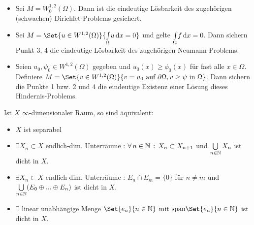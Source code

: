 \documentclass{cheat-sheet}
\begin{document}
\begin{bsp}
  \begin{itemize}
    \item Sei $M = W_0^{1,2}(\Omega)$. Dann ist die eindeutige Lösbarkeit des zugehörigen (schwachen) Dirichlet-Problems gesichert.
    \item Sei $M = \Set{ u \in W^{1,2}(\Omega) }{ \Int{\Omega}{}{u}{x} = 0 }$ und gelte ${\textstyle \int\limits_{\Omega}^{}} f \,\mathrm{d} x = 0$. Dann sichern Punkt 3, 4 die eindeutige Lösbarkeit des zugehörigen Neumann-Problems.
    \item Seien $u_0, \psi_0 \in W^{1,2}(\Omega)$ gegeben und $u_0(x) \geq \phi_0(x)$ für fast alle $x \in \Omega$. Definiere $M = \Set{ v \in W^{1,2}(\Omega) }{ v = u_0 \text{ auf } \partial \Omega, v \geq \psi \text{ in } \Omega }$. Dann sichern die Punkte 1 bzw. 2 und 4 die eindeutige Existenz einer Lösung dieses Hindernis-Problems.
  \end{itemize}
\end{bsp}




\begin{lem}
  Ist $X$ $\infty$-dimensionaler Raum, so sind äquivalent:
  \begin{itemize}
    \item $X$ ist separabel
    \item $\exists X_n \subset X$ endlich-dim. Unterräume : $\forall \,n \in \mathbb{N} \,:\, X_n \subset X_{n{+}1}$ und $\bigcup_{n \in \N} X_n$ ist dicht in $X$.
    \item $\exists X_n \subset X$ endlich-dim. Unterräume : $E_n \cap E_m = \{ 0 \}$ für $n \not= m$ und $\bigcup_{n \in \N} (E_0 \oplus ... \oplus E_n)$ ist dicht in $X$.
    \item $\exists$ linear unabhängige Menge $\Set{ e_n }{ n \in \N }$ mit $\mathrm{span}\Set{e_n}{ n \in \N }$ ist dicht in $X$.
  \end{itemize}
\end{lem}

\end{document}
